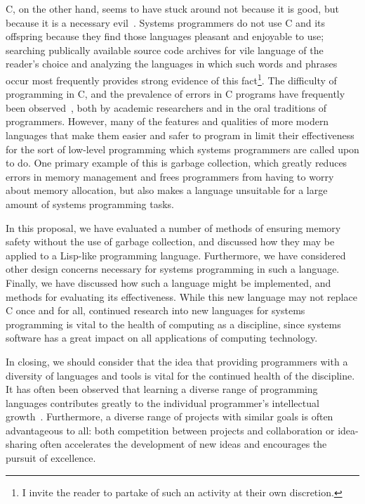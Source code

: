 \documentclass[11pt,a4paper]{article}
\theoremstyle{break}
\begin{document}
C, on the other hand, seems to have stuck around not because it is good, but because it is a necessary evil~\cite{Shapiro:2006:PLC:1215995.1216004}. Systems programmers do not use C and its offspring because they find those languages pleasant and enjoyable to use; searching publically available source code archives for vile language of the reader's choice and analyzing the languages in which such words and phrases occur most frequently provides strong evidence of this fact\footnote{I invite the reader to partake of such an activity at their own discretion.}. The difficulty of programming in C, and the prevalence of errors in C programs have frequently been observed~\cite{Shapiro:2006:PLC:1215995.1216004,Bhattacharya:2011:APL:1985793.1985817,Ray:2014:LSS:2635868.2635922}, both by academic researchers and in the oral traditions of programmers. However, many of the features and qualities of more modern languages that make them easier and safer to program in limit their effectiveness for the sort of low-level programming which systems programmers are called upon to do. One primary example of this is garbage collection, which greatly reduces errors in memory management and frees programmers from having to worry about memory allocation, but also makes a language unsuitable for a large amount of systems programming tasks.

In this proposal, we have evaluated a number of methods of ensuring memory safety without the use of garbage collection, and discussed how they may be applied to a Lisp-like programming language. Furthermore, we have considered other design concerns necessary for systems programming in such a language. Finally, we have discussed how such a language might be implemented, and methods for evaluating its effectiveness. While this new language may not replace C once and for all, continued research into new languages for systems programming is vital to the health of computing as a discipline, since systems software has a great impact on all applications of computing technology.

In closing, we should consider that the idea that providing programmers with a diversity of languages and tools is vital for the continued health of the discipline. It has often been observed that learning a diverse range of programming languages contributes greatly to the individual programmer's intellectual growth~\cite{raymond2003become,norvig2001teach}. Furthermore, a diverse range of projects with similar goals is often advantageous to all: both competition between projects and collaboration or idea-sharing often accelerates the development of new ideas and encourages the pursuit of excellence.

\pagebreak
\begingroup
\setlength{\emergencystretch}{1em} %
\printbibliography
\endgroup
\end{document}
